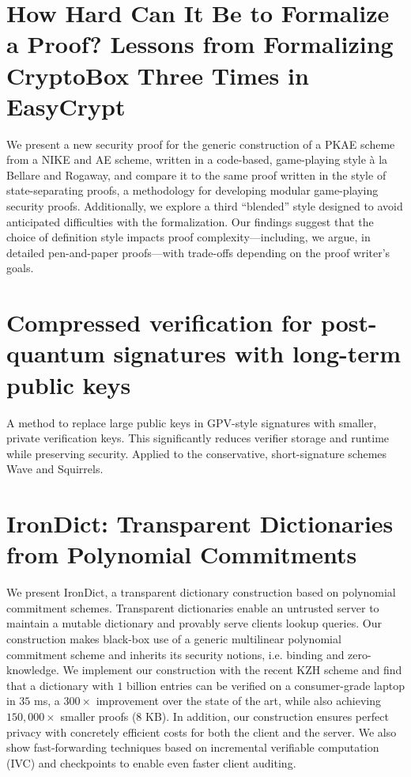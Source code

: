 \documentclass[11pt,oneside]{book}
\theoremstyle{definition}
\theoremstyle{remark}
\theoremstyle{plain}
\begin{document}
\section{\cite{cryptoeprint:2025/1569} How Hard Can It Be to Formalize a Proof? Lessons from Formalizing CryptoBox Three Times in EasyCrypt}
We present a new security proof for the generic construction of a PKAE scheme from a NIKE and AE scheme, written in a code-based, game-playing style à la Bellare and Rogaway, and compare it to the same proof written in the style of state-separating proofs, a methodology for developing modular game-playing security proofs. Additionally, we explore a third “blended” style designed to avoid anticipated difficulties with the formalization. Our findings suggest that the choice of definition style impacts proof complexity—including, we argue, in detailed pen-and-paper proofs—with trade-offs depending on the proof writer’s goals.
\section{\cite{cryptoeprint:2025/1576} Compressed verification for post-quantum signatures with long-term public keys}
A method to replace large public keys in GPV-style signatures with smaller, private verification keys. This significantly reduces verifier storage and runtime while preserving security. Applied to the conservative, short-signature schemes Wave and Squirrels.
\section{\cite{cryptoeprint:2025/1580} IronDict: Transparent Dictionaries from Polynomial Commitments}
We present IronDict, a transparent dictionary construction based on polynomial commitment schemes. Transparent dictionaries enable an untrusted server to maintain a mutable dictionary and provably serve clients lookup queries.  Our construction makes black-box use of a generic multilinear polynomial commitment scheme and inherits its security notions, i.e. binding and zero-knowledge. We implement our construction with the recent KZH scheme and find that a dictionary with $1$ billion entries can be verified on a consumer-grade laptop in $35$ ms, a $300\times$ improvement over the state of the art, while also achieving $150{,}000\times$ smaller proofs ($8$ KB). In addition, our construction ensures perfect privacy with concretely efficient costs for both the client and the server. We also show fast-forwarding techniques based on incremental verifiable computation (IVC) and checkpoints to enable even faster client auditing.
\end{document}
